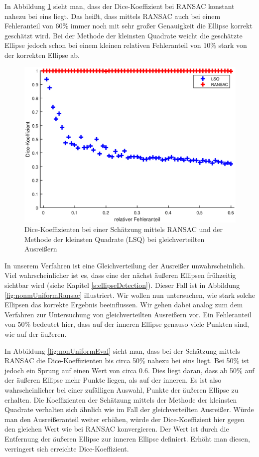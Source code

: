 {In Abbildung \ref{fig:uniformEval} sieht man, dass der Dice-Koeffizient bei RANSAC konstant nahezu bei eins liegt. Das heißt, dass mittels RANSAC auch bei einem Fehleranteil von 60\% immer noch mit sehr großer Genauigkeit die Ellipse korrekt geschätzt wird. Bei der Methode der kleinsten Quadrate weicht die geschätzte Ellipse jedoch schon bei einem kleinen relativen Fehleranteil von 10\% stark von der korrekten Ellipse ab. 


\begin{figure}[!htb]
	\centering
	\includegraphics[width=\textwidth]{images/ransacEval0.eps}
	\caption{Dice-Koeffizienten bei einer Schätzung mittels RANSAC und der Methode der kleinsten Quadrate (LSQ) bei gleichverteilten Ausreißern}
	\label{fig:uniformEval}
\end{figure}

In unserem Verfahren ist eine Gleichverteilung der Ausreißer unwahrscheinlich. Viel wahrscheinlicher ist es, dass eine der nächst äußeren Ellipsen frühzeitig sichtbar wird (siehe Kapitel \ref{s:ellipseDetection}). 
Dieser Fall ist in Abbildung \ref{fig:nonmUniformRansac} illustriert. Wir wollen nun untersuchen, wie stark solche Ellipsen das korrekte Ergebnis beeinflussen. Wir gehen dabei analog zum dem Verfahren zur Untersuchung von gleichverteilten Ausreißern vor. Ein Fehleranteil von 50\% bedeutet hier, dass auf der inneren Ellipse genauso viele Punkten sind, wie auf der äußeren. 

In Abbildung \ref{fig:nonUniformEval} sieht man, dass bei der Schätzung mittels RANSAC die Dice-Koeffizienten bis circa 50\% nahezu bei eins liegt. Bei 50\% ist jedoch ein Sprung auf einen Wert von circa $0.6$. Dies liegt daran, dass ab 50\% auf der äußeren Ellipse mehr Punkte liegen, als auf der inneren. Es ist also wahrscheinlicher bei einer zufälligen Auswahl, Punkte der äußeren Ellipse zu erhalten. Die Koeffizienten der Schätzung mittels der Methode der kleinsten Quadrate verhalten sich ähnlich wie im Fall der gleichverteilten Ausreißer. Würde man den Ausreißeranteil weiter erhöhen, würde der Dice-Koeffizient hier gegen den gleichen Wert wie bei RANSAC konvergieren. Der Wert ist durch die Entfernung der äußeren Ellipse zur inneren Ellipse definiert. Erhöht man diesen, verringert sich erreichte Dice-Koeffizient. 

}
